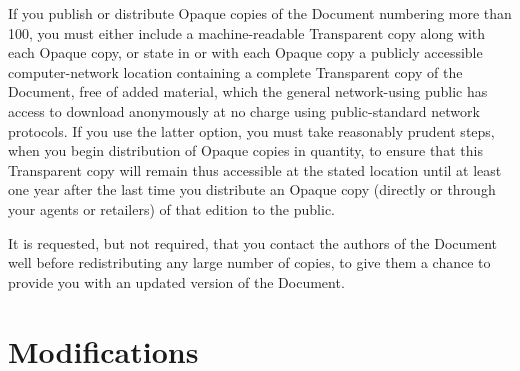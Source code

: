 If you publish or distribute Opaque copies of the Document numbering
more than 100, you must either include a machine-readable Transparent
copy along with each Opaque copy, or state in or with each Opaque
copy a publicly accessible computer-network location containing a
complete Transparent copy of the Document, free of added material,
which the general network-using public has access to download anonymously
at no charge using public-standard network protocols. If you use the
latter option, you must take reasonably prudent steps, when you begin
distribution of Opaque copies in quantity, to ensure that this Transparent
copy will remain thus accessible at the stated location until at least
one year after the last time you distribute an Opaque copy (directly
or through your agents or retailers) of that edition to the public.

It is requested, but not required, that you contact the authors of
the Document well before redistributing any large number of copies,
to give them a chance to provide you with an updated version of the
Document.

\section{Modifications}

